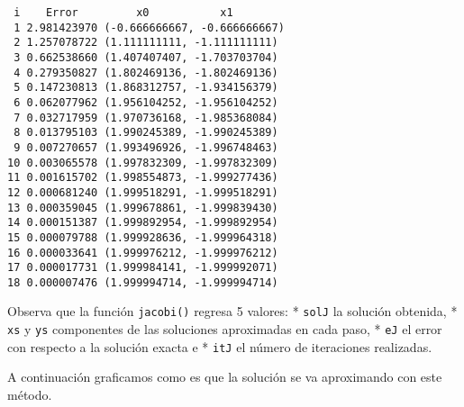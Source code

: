 \documentclass[
  letterpaper,
  DIV=11,
  numbers=noendperiod]{scrreprt}
\begin{document}
\begin{verbatim}
 i    Error         x0           x1     
 1 2.981423970 (-0.666666667, -0.666666667)
 2 1.257078722 (1.111111111, -1.111111111)
 3 0.662538660 (1.407407407, -1.703703704)
 4 0.279350827 (1.802469136, -1.802469136)
 5 0.147230813 (1.868312757, -1.934156379)
 6 0.062077962 (1.956104252, -1.956104252)
 7 0.032717959 (1.970736168, -1.985368084)
 8 0.013795103 (1.990245389, -1.990245389)
 9 0.007270657 (1.993496926, -1.996748463)
10 0.003065578 (1.997832309, -1.997832309)
11 0.001615702 (1.998554873, -1.999277436)
12 0.000681240 (1.999518291, -1.999518291)
13 0.000359045 (1.999678861, -1.999839430)
14 0.000151387 (1.999892954, -1.999892954)
15 0.000079788 (1.999928636, -1.999964318)
16 0.000033641 (1.999976212, -1.999976212)
17 0.000017731 (1.999984141, -1.999992071)
18 0.000007476 (1.999994714, -1.999994714)
\end{verbatim}

Observa que la función \texttt{jacobi()} regresa 5 valores: *
\texttt{solJ} la solución obtenida, * \texttt{xs} y \texttt{ys}
componentes de las soluciones aproximadas en cada paso, * \texttt{eJ} el
error con respecto a la solución exacta e * \texttt{itJ} el número de
iteraciones realizadas.

A continuación graficamos como es que la solución se va aproximando con
este método.
\end{document}
